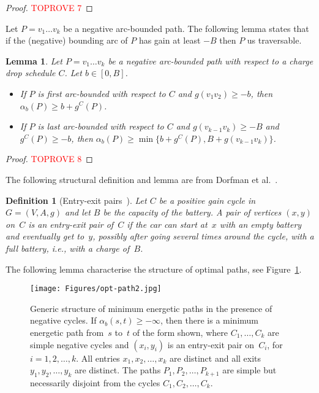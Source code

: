 \documentclass[11pt]{article}
\newtheorem{lemma}[theorem]{Lemma}
\newtheorem{definition}[theorem]{Definition}
\begin{document}
\begin{proof}\textcolor{red}{TOPROVE 7}\end{proof}

Let $P= v_1 \ldots v_k$ be a negative arc-bounded path. The following lemma states that if the (negative) bounding arc of $P$ has gain at least $-B$ then $P$ us traversable.

\begin{lemma}\label{lemma:alpha-of-arc-bounded}
    Let $P=v_1\ldots v_k$ be a negative arc-bounded path with respect to a charge drop schedule $C$. Let $b\in [0,B]$.
    \begin{itemize}
        \item If $P$ is first arc-bounded with respect to $C$ and $g(v_1 v_2)\ge -b$, 
        then $\alpha_b(P) \ge b+g^C(P)$.
        \item If $P$ is last arc-bounded with respect to $C$ and $g(v_{k-1} v_k)\ge -B$ and $ g^C(P)\ge -b$, then   $\alpha_b(P) \ge \min \{  b+g^C(P), B + g(v_{k-1} v_k) \}$.
    \end{itemize}
\end{lemma}

\begin{proof}\textcolor{red}{TOPROVE 8}\end{proof}



The following structural definition and lemma are from Dorfman et al.~\cite{DorfmanKTZ23}.

\begin{definition}[Entry-exit pairs~\cite{DorfmanKTZ23}]\label{D-entry-exit}
Let $C$ be a positive gain cycle in $G=(V,A,g)$ and let $B$ be the capacity of the battery. A pair of vertices $(x,y)$ on~$C$ is an \emph{entry-exit} pair of~$C$ if the car can start at~$x$ with an empty battery and eventually get to~$y$, possibly after going several times around the cycle, with a full battery, i.e., with a charge of~$B$.
\end{definition}
 
The following lemma characterise the structure of optimal paths, see Figure~\ref{fig:opt-path}.

\begin{figure}[t]
    \centering
    \texttt{[image: Figures/opt-path2.jpg]}
    \caption{Generic structure of minimum energetic paths in the presence of negative cycles. If $\alpha_b(s,t)\ge -\infty$, then there is a minimum energetic path from~$s$ to~$t$ of the form shown, where $C_1,\ldots,C_k$ are simple negative cycles and $(x_i,y_i)$ is an entry-exit pair on~$C_i$, for $i=1,2,\ldots,k$. All entries $x_1,x_2,\ldots,x_k$ are distinct and all exits $y_1,y_2,\ldots,y_k$ are distinct. The paths $P_1,P_2,\ldots,P_{k+1}$ are simple but necessarily disjoint from the cycles $C_1,C_2,\ldots,C_k$.
    }
    \label{fig:opt-path}
\end{figure}
\end{document}

